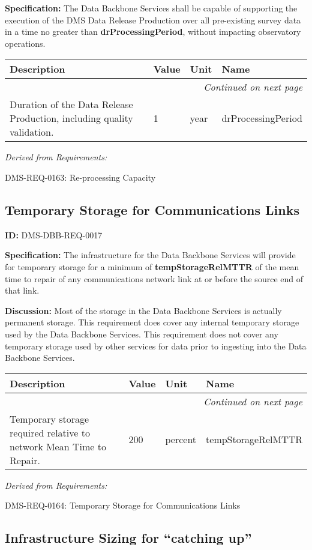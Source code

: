 \documentclass[SE,toc]{lsstdoc}
\makeatletter
\newcommand{\paramname}[1]{\hspace{0pt}#1}
\newcommand{\unitname}[1]{\hspace{0pt}#1}
\newenvironment{parameters}[0]{%
\setlength\LTleft{0pt}
\setlength\LTright{\fill}
\begin{small}
\begin{longtable}[]{|p{0.49\textwidth}|l|p{0.6in}|p{1.70in}@{}|}

\hline \textbf{Description} & \textbf{Value} & \textbf{Unit} & \textbf{Name} \\ \hline
\endhead

\hline \multicolumn{4}{r}{\emph{Continued on next page}} \\
\endfoot

\hline\hline
\endlastfoot
}{%
\hline
\end{longtable}
\end{small}
}
\makeatother
\begin{document}
\textbf{Specification:}
The Data Backbone Services shall be capable of supporting the execution of the DMS Data Release Production over all pre-existing survey data in a time no greater than \textbf{drProcessingPeriod}, without impacting observatory operations.

\begin{parameters}
Duration of the Data Release Production, including quality validation.
&
1
&
\unitname{%
year
}
&
\paramname{%
drProcessingPeriod
} \\\hline
\end{parameters}

\emph{Derived from Requirements:}

DMS-REQ-0163:
Re-processing Capacity \newline

\subsection{Temporary Storage for Communications Links}

\label{DMS-DBB-REQ-0017}
\textbf{ID:} DMS-DBB-REQ-0017

\textbf{Specification:}
The infrastructure for the Data Backbone Services will provide for temporary storage for a minimum of \textbf{tempStorageRelMTTR} of the mean time to repair of any communications network link at or before the source end of that link.

\textbf{Discussion:}
Most of the storage in the Data Backbone Services is actually permanent storage.    This requirement does cover any internal temporary storage used by the Data Backbone Services.   This requirement does not cover any temporary storage used by other services for data prior to ingesting into the Data Backbone Services.

\begin{parameters}
Temporary storage required relative to network Mean Time to Repair.
&
200
&
\unitname{%
percent
}
&
\paramname{%
tempStorageRelMTTR
} \\\hline
\end{parameters}

\emph{Derived from Requirements:}

DMS-REQ-0164:
Temporary Storage for Communications Links \newline

\subsection{Infrastructure Sizing for “catching up”}
\end{document}
